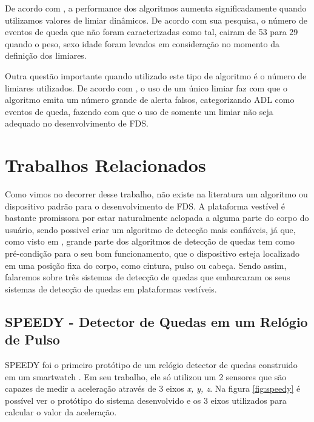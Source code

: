 De acordo com \cite{cao2012falld}, a performance dos algoritmos aumenta significadamente quando utilizamos valores de limiar dinâmicos. De acordo com sua pesquisa, o número de eventos de queda que não foram caracterizadas como tal, cairam de 53 para 29 quando o peso, sexo idade foram levados em consideração no momento da definição dos limiares.

Outra questão importante quando utilizado este tipo de algoritmo é o número de limiares utilizados. De acordo com \cite{casilari2015analysis}, o uso de um único limiar faz com que o algoritmo emita um número grande de alerta falsos, categorizando \ac{ADL} como eventos de queda, fazendo com que o uso de somente um limiar não seja adequado no desenvolvimento de \ac{FDS}.


\section{Trabalhos Relacionados}
\label{sec:FDS_examples}
Como vimos no decorrer desse trabalho, não existe na literatura um algoritmo ou dispositivo padrão para o desenvolvimento de \ac{FDS}. A plataforma vestível é bastante promissora por estar naturalmente aclopada a alguma parte do corpo do usuário, sendo possivel criar um algoritmo de detecção mais confiáveis, já que, como visto em \cite{casilari2015analysis}, grande parte dos algoritmos de detecção de quedas tem como pré-condição para o seu bom funcionamento, que o dispositivo esteja localizado em uma posição fixa do corpo, como cintura, pulso ou cabeça. Sendo assim, falaremos sobre três sistemas de detecção de quedas que embarcaram os seus sistemas de detecção de quedas em plataformas vestíveis. 

\subsection{SPEEDY - Detector de Quedas em um Relógio de Pulso}
SPEEDY foi o primeiro protótipo de um relógio detector de quedas construido em um smartwatch \citep{degen2003speedy}. Em seu trabalho, ele só utilizou um 2 sensores que são capazes de medir a aceleração através de 3 eixos \textit{x, y, z}. Na figura \ref{fig:speedy} é possível ver o protótipo do sistema desenvolvido e os 3 eixos utilizados para calcular o valor da aceleração. 

